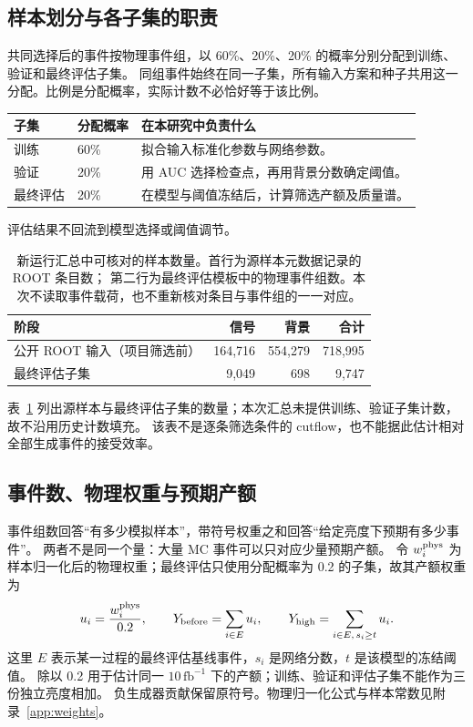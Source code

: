 \documentclass[11pt,a4paper,fontset=fandol,scheme=plain]{ctexart}
\begin{document}
\subsection{样本划分与各子集的职责}

共同选择后的事件按物理事件组，以 60\%、20\%、20\% 的概率分别分配到训练、验证和最终评估子集。
同组事件始终在同一子集，所有输入方案和种子共用这一分配。比例是分配概率，实际计数不必恰好等于该比例。

\begin{center}
\small
\begin{tabularx}{\linewidth}{@{}p{.14\linewidth}p{.18\linewidth}Y@{}}
\toprule
子集 & 分配概率 & 在本研究中负责什么 \\
\midrule
训练 & 60\% & 拟合输入标准化参数与网络参数。 \\
验证 & 20\% & 用 AUC 选择检查点，再用背景分数确定阈值。 \\
最终评估 & 20\% & 在模型与阈值冻结后，计算筛选产额及质量谱。 \\
\bottomrule
\end{tabularx}
\end{center}
评估结果不回流到模型选择或阈值调节。
\begin{table}[H]
\caption{新运行汇总中可核对的样本数量。首行为源样本元数据记录的 ROOT 条目数；
第二行为最终评估模板中的物理事件组数。本次不读取事件载荷，也不重新核对条目与事件组的一一对应。}
\label{tab:population}
\centering
\small
\begin{tabular}{lrrr}
\toprule
阶段 & 信号 & 背景 & 合计 \\
\midrule
公开 ROOT 输入（项目筛选前） & 164,716 & 554,279 & 718,995 \\
最终评估子集 & 9,049 & 698 & 9,747 \\
\bottomrule
\end{tabular}
\end{table}
表~\ref{tab:population} 列出源样本与最终评估子集的数量；本次汇总未提供训练、验证子集计数，故不沿用历史计数填充。
该表不是逐条筛选条件的 cutflow，也不能据此估计相对全部生成事件的接受效率。

\subsection{事件数、物理权重与预期产额}

\label{sec:weights}
事件组数回答“有多少模拟样本”，带符号权重之和回答“给定亮度下预期有多少事件”。
两者不是同一个量：大量 MC 事件可以只对应少量预期产额。
令 $w_i^{\rm phys}$ 为样本归一化后的物理权重；最终评估只使用分配概率为 0.2 的子集，故其产额权重为
\[
 u_i=\frac{w_i^{\rm phys}}{0.2},\qquad
 Y_{\rm before}=\sum_{i\in E}u_i,\qquad
 Y_{\rm high}=\sum_{i\in E,\,s_i\geq t}u_i.
\]
这里 $E$ 表示某一过程的最终评估基线事件，$s_i$ 是网络分数，$t$ 是该模型的冻结阈值。
除以 0.2 用于估计同一 $10\,\mathrm{fb}^{-1}$ 下的产额；训练、验证和评估子集不能作为三份独立亮度相加。
负生成器贡献保留原符号。物理归一化公式与样本常数见附录~\ref{app:weights}。
\end{document}
